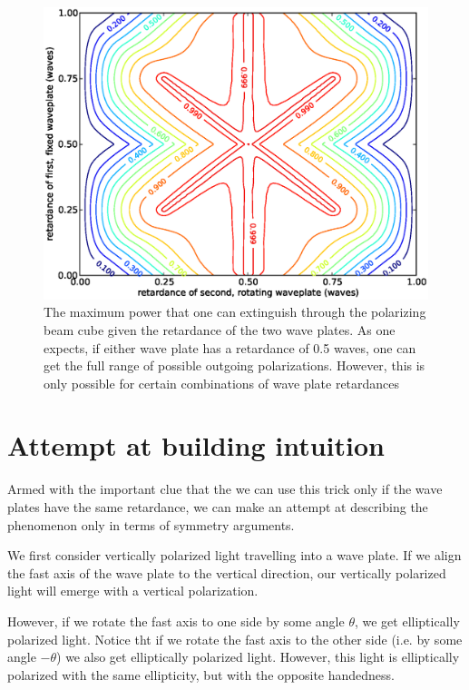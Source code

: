 \begin{figure}
    \centerline{\includegraphics[width=.9\textwidth]{NewNotesAsymmetricFigure}}
    \caption[Maximum extinguished power for various combinations of retardances]{\label{asymmetric}
   The maximum power that one can extinguish through the polarizing beam cube given the retardance of the two wave plates. As one expects, if either wave plate has a retardance of 0.5 waves, one can get the full range of possible outgoing polarizations. However, this is only possible for certain combinations of wave plate retardances}
\end{figure}

\section{Attempt at building intuition}

Armed with the important clue that the we can use this trick only if the wave plates have the same retardance, we can make an attempt at describing the phenomenon only in terms of symmetry arguments.

We first consider vertically polarized light travelling into a wave plate. If we align the fast axis of the wave plate to the vertical direction, our vertically polarized light will emerge with a vertical polarization. 

However, if we rotate the fast axis to one side by some angle $\theta$, we get elliptically polarized light. Notice tht if we rotate the fast axis to the other side (i.e. by some angle $-\theta$) we also get elliptically polarized light. However, this light is elliptically polarized with the same ellipticity, but with the opposite handedness.

